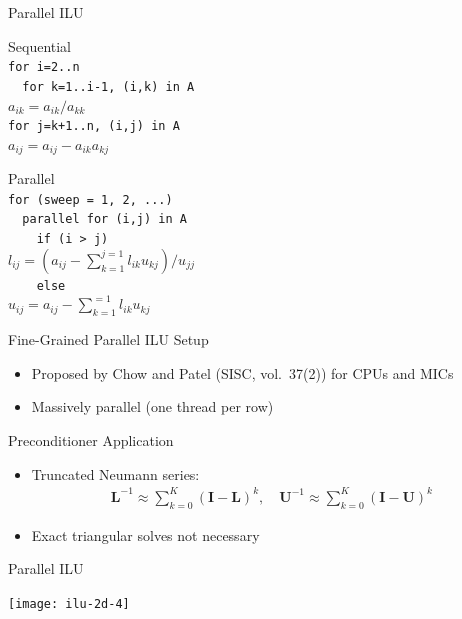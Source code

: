 \begin{frame}[fragile]{Parallel ILU}

\begin{minipage}{0.45\textwidth}
  Sequential \\
  \lstinline|for i=2..n| \\
  \lstinline|  for k=1..i-1, (i,k) in A| \\
  \hspace*{0.7cm}$a_{ik} =  a_{ik}/a_{kk}$ \\
  \hspace*{0.7cm}\lstinline|for j=k+1..n, (i,j) in A| \\
  \hspace*{1cm}$a_{ij} =  a_{ij} - a_{ik}a_{kj}$ \\
\end{minipage} \hfill
\begin{minipage}{0.5\textwidth}
  Parallel \\
  \lstinline|for (sweep = 1, 2, ...)| \\
  \lstinline|  parallel for (i,j) in A| \\
  \lstinline|    if (i > j)| \\ 
  \hspace*{1cm}$l_{ij} =  (a_{ij} - \sum_{k=1}^{j=1} l_{ik}u_{kj}) / u_{jj}$ \\
  \lstinline|    else| \\
  \hspace*{1cm}$u_{ij} =  a_{ij} - \sum_{k=1}^{=1} l_{ik}u_{kj}$
\end{minipage}


  \begin{block}{Fine-Grained Parallel ILU Setup}
   \begin{itemize}
    \item Proposed by Chow and Patel (SISC, vol.~37(2)) for CPUs and MICs
    \item Massively parallel (one thread per row)
   \end{itemize}
  \end{block}
  
  
  \begin{block}{Preconditioner Application}
   \begin{itemize}
    \item Truncated Neumann series:
     \begin{align*} \mathbf{L}^{-1} \approx \sum_{k=0}^K (\mathbf{I} - \mathbf{L})^k, \quad \mathbf{U}^{-1} \approx \sum_{k=0}^K (\mathbf{I} - \mathbf{U})^k \end{align*}
    \item Exact triangular solves not necessary
   \end{itemize}
  \end{block}

\end{frame}


\begin{frame}{Parallel ILU}
  \begin{center}
    \texttt{[image: ilu-2d-4]}
  \end{center}
\end{frame}
